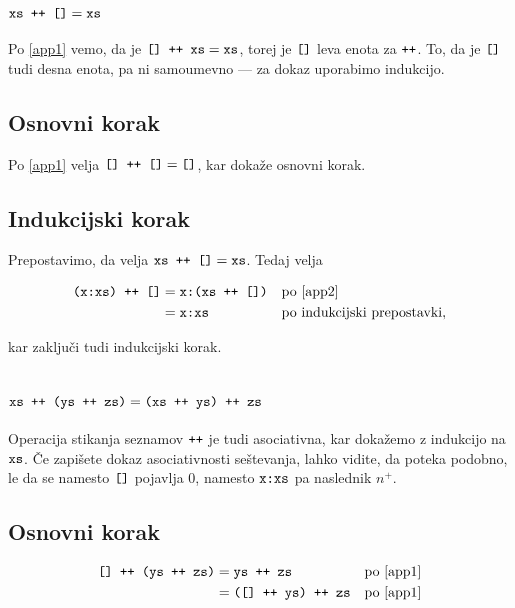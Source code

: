 \documentclass[11pt,a4paper]{article}
\begin{document}
\section{$\mbox{\texttt{xs ++ []}} = \mbox{\texttt{xs}}$}
\label{sec:desna-enota}

Po \eqref{app1} vemo, da je $\mbox{\texttt{[] ++ xs}} = \mbox{\texttt{xs}}$, torej je $\mbox{\texttt{[]}}$ leva enota za $\mbox{\texttt{++}}$. To, da je $\mbox{\texttt{[]}}$ tudi desna enota, pa ni samoumevno --- za dokaz uporabimo indukcijo.

\subsection*{Osnovni korak}

Po \eqref{app1} velja $\mbox{\texttt{[] ++ []}} = \mbox{\texttt{[]}}$, kar dokaže osnovni korak.

\subsection*{Indukcijski korak}

Prepostavimo, da velja $\mbox{\texttt{xs ++ []}} = \mbox{\texttt{xs}}$. Tedaj velja

\begin{align*}
  \mbox{\texttt{(x:xs) ++ []}}
  &= \mbox{\texttt{x:(xs ++ [])}}
    &&\text{po \eqref{app2}} \\
  &= \mbox{\texttt{x:xs}}
    &&\text{po indukcijski prepostavki},
\end{align*}

kar zaključi tudi indukcijski korak.


\section{$\mbox{\texttt{xs ++ (ys ++ zs)}} = \mbox{\texttt{(xs ++ ys) ++ zs}}$}
\label{sec:asociativnost}

Operacija stikanja seznamov $\mbox{\texttt{++}}$ je tudi asociativna, kar dokažemo z indukcijo na $\mbox{\texttt{xs}}$. Če zapišete dokaz asociativnosti seštevanja, lahko vidite, da poteka podobno, le da se namesto $\mbox{\texttt{[]}}$ pojavlja $0$, namesto $\mbox{\texttt{x:xs}}$ pa naslednik $n^{+}$.

\subsection*{Osnovni korak}

\begin{align*}
  \mbox{\texttt{[] ++ (ys ++ zs)}}
  &= \mbox{\texttt{ys ++ zs}}
    &&\text{po \eqref{app1}} \\
  &= \mbox{\texttt{([] ++ ys) ++ zs}}
    &&\text{po \eqref{app1}}
\end{align*}
\end{document}
